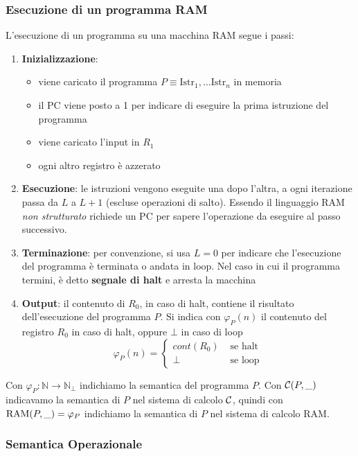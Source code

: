 \begin{center}
	
\end{center}

\subsubsection{Esecuzione di un programma RAM}

L'esecuzione di un programma su una macchina RAM segue i passi:
\begin{enumerate}
	\item \textbf{Inizializzazione}:
	\begin{itemize}
		\item viene caricato il programma $P \equiv \text{Istr}_1, \dots \text{Istr}_n$ in memoria
		\item il PC viene posto a 1 per indicare di eseguire la prima istruzione del programma
		\item viene caricato l'input in $R_1$
		\item ogni altro registro è azzerato
	\end{itemize}
	\item \textbf{Esecuzione}: le istruzioni vengono eseguite una dopo l'altra, a ogni iterazione passa da $L$ a $L+1$ (escluse operazioni di salto). Essendo il linguaggio RAM \textit{non strutturato} richiede un PC per sapere l'operazione da eseguire al passo successivo.
	\item \textbf{Terminazione}: per convenzione, si usa $L=0$ per indicare che l'esecuzione del programma è terminata o andata in loop. Nel caso in cui il programma termini, è detto \textbf{segnale di halt} e arresta la macchina
	\item \textbf{Output}: il contenuto di $R_0$, in caso di halt, contiene il risultato dell'esecuzione del programma $P$. Si indica con $\varphi_P(n)$ il contenuto del registro $R_0$ in caso di halt, oppure $\bot$ in caso di loop
	$$ 
	\varphi_P (n) = \begin{cases}
		cont(R_0) & \text{ se halt} \\
		\bot & \text{ se loop}
	\end{cases}
	$$
\end{enumerate}
Con $\varphi_P: \mathbb{N} \rightarrow \mathbb{N}_\bot$ indichiamo la semantica del programma $P$. Con $\mathcal{C}(P,\_)$ indicavamo la semantica di $P$ nel sistema di calcolo $\mathcal{C}$, quindi con $\text{RAM}(P,\_) = \varphi_P$ indichiamo la semantica di $P$ nel sistema di calcolo RAM.

\subsubsection{Semantica Operazionale}

